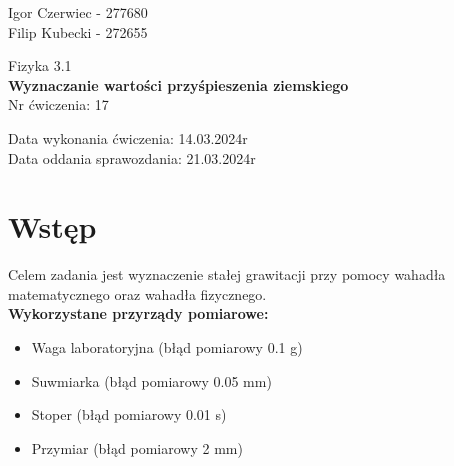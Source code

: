 \documentclass[11pt]{article}
\begin{document}
    \begin{flushright}
        \large{
            Igor Czerwiec - 277680\\
            Filip Kubecki - 272655
        }\\
    \end{flushright}
    \begin{center}
        \large{Fizyka 3.1}\\
        \vspace{2mm}
        \LARGE{\textbf{Wyznaczanie wartości przyśpieszenia ziemskiego}}\\
        \vspace{3mm}
        \huge{Nr ćwiczenia: 17}\\
        \vspace{1cm}
    \end{center}
    \begin{flushright}
        \large{
            Data wykonania ćwiczenia: 14.03.2024r\\
            Data oddania sprawozdania: 21.03.2024r
        }\\
    \end{flushright}

    \section{Wstęp}
    Celem zadania jest wyznaczenie stałej grawitacji przy
    pomocy wahadła matematycznego oraz wahadła fizycznego.\\
    \textbf{Wykorzystane przyrządy pomiarowe:}
    \begin{itemize}
        \itemsep0em
        \item Waga laboratoryjna (błąd pomiarowy 0.1 g)
        \item Suwmiarka (błąd pomiarowy 0.05 mm)
        \item Stoper (błąd pomiarowy 0.01 s)
        \item Przymiar (błąd pomiarowy 2 mm)
    \end{itemize}
\end{document}
